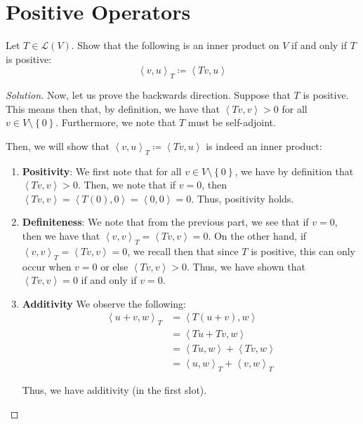 \documentclass{article}
\newenvironment{solution}{\begin{proof}[Solution]}{\end{proof}}
\newcommand{\innerproduct}[2]{\left\langle{#1}, {#2}\right\rangle}
\begin{document}
\section{Positive Operators}
\begin{hw}
	Let $T \in \mathcal L(V)$. Show that the following is an inner product on $V$ if and only if $T$ is positive:
	\begin{equation*}
		\innerproduct{v}{u}_{T} \coloneq \innerproduct{Tv}{u}
	\end{equation*}
\end{hw}
\begin{solution}
	Now, let us prove the backwards direction. Suppose that $T$ is positive. This means then that, by definition, we have that $\innerproduct{Tv}{v} > 0$ for all $v \in V \setminus \left\{  0 \right\}$. Furthermore, we note that $T$ must be self-adjoint.
	
	Then, we will show that $\innerproduct{v}{u}_{T} \coloneq \innerproduct{Tv}{u}$ is indeed an inner product:
	\begin{enumerate}
		\item \textbf{Positivity}: We first note that for all $v \in V \setminus \left\{  0 \right\}$, we have by definition that $\innerproduct{Tv}{v} > 0$. Then, we note that if $v = 0$, then $\innerproduct{Tv}{v} = \innerproduct{T(0)}{0} = \innerproduct{0}{0} = 0$. Thus, positivity holds.
		
		\item \textbf{Definiteness}: We note that from the previous part, we see that if $v = 0$, then we have that $\innerproduct{v}{v}_{T} = \innerproduct{Tv}{v} = 0$. On the other hand, if $\innerproduct{v}{v}_{T} = \innerproduct{Tv}{v} = 0$, we recall then that since $T$ is positive, this can only occur when $v = 0$ or else $\innerproduct{Tv}{v} > 0$. Thus, we have shown that $\innerproduct{Tv}{v} = 0$ if and only if $v = 0$.
		
		\item \textbf{Additivity} We observe the following:
		\begin{align*}
			\innerproduct{u+v}{w}_{T} &= \innerproduct{T(u+v)}{w} \\
			&= \innerproduct{Tu + Tv}{w} \\
			&= \innerproduct{Tu}{w} + \innerproduct{Tv}{w} \\
			&= \innerproduct{u}{w}_{T} + \innerproduct{v}{w}_{T}
		\end{align*}
		
		Thus, we have additivity (in the first slot).
		

\end{enumerate}
\end{solution}
\end{document}
